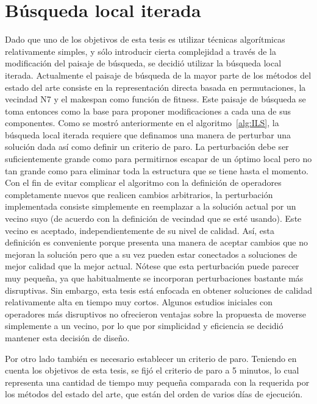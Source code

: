 \section{Búsqueda local iterada}

Dado que uno de los objetivos de esta tesis es utilizar técnicas algorítmicas relativamente simples, y sólo introducir cierta complejidad
a través de la modificación del paisaje de búsqueda, se decidió utilizar la búsqueda local iterada.
%
Actualmente el paisaje de búsqueda de la mayor parte de los métodos del estado del arte consiste en la representación directa basada en permutaciones, la vecindad N7 y el makespan como función de fitness. Este paisaje de búsqueda se toma entonces como la base para proponer modificaciones a cada una de sus componentes.
%
Como se mostró anteriormente en el algoritmo~\ref{alg:ILS}, la búsqueda local iterada requiere que definamos una manera de perturbar una 
solución dada así como definir un criterio de paro. 
%
La perturbación debe ser suficientemente grande como para permitirnos escapar de un óptimo local pero no tan grande como para eliminar toda 
la estructura que se tiene hasta el momento.
%
Con el fin de evitar complicar el algoritmo con la definición de operadores completamente nuevos que realicen cambios arbitrarios, la 
perturbación implementada consiste simplemente en reemplazar a la solución actual por un vecino suyo (de acuerdo con la definición de vecindad 
que se esté usando). 
%
Este vecino es aceptado, independientemente de su nivel de calidad.
%
Así, esta definición es conveniente porque presenta una manera de aceptar cambios que no mejoran la solución pero que a su vez pueden estar 
conectados a soluciones de mejor calidad que la mejor actual.
%
Nótese que esta perturbación puede parecer muy pequeña, ya que habitualmente se incorporan perturbaciones bastante más disruptivas.
%
Sin embargo, esta tesis está enfocada en obtener soluciones de calidad relativamente alta en tiempo muy cortos.
%
Algunos estudios iniciales con operadores más disruptivos no ofrecieron ventajas sobre la propuesta de moverse simplemente a un vecino,
por lo que por simplicidad y eficiencia se decidió mantener esta decisión de diseño.

Por otro lado también es necesario establecer un criterio de paro. 
%
Teniendo en cuenta los objetivos de esta tesis, se fijó el criterio de paro a 5 minutos, lo cual representa una cantidad de tiempo muy pequeña comparada 
con la requerida por los métodos del estado del arte, que están del orden de varios días de ejecución.


